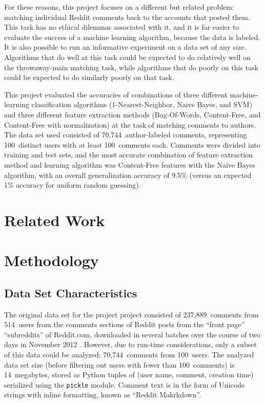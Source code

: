 \documentclass{article}
\begin{document}
For these reasons, this project focuses on a different but related problem: matching individual Reddit comments back to the accounts that posted them. This task has no ethical dilemmas associated with it, and it is far easier to evaluate the success of a machine learning algorithm, because the data is labeled. It is also possible to run an informative experiment on a data set of any size. Algorithms that do well at this task could be expected to do relatively well on the throwaway-main matching task, while algorithms that do poorly on this task could be expected to do similarly poorly on that task.

This project evaluated the accuracies of combinations of three different machine-learning classification algorithms (1-Nearest-Neighbor, Naive Bayes, and SVM) and three different feature extraction methods (Bag-Of-Words, Content-Free, and Content-Free with normalization) at the task of matching comments to authors. The data set used consisted of 70,744~author-labeled comments, representing 100~distinct users with at least 100~comments each. Comments were divided into training and test sets, and the most accurate combination of feature extraction method and learning algorithm was Content-Free features with the Naive Bayes algorithm, with an overall generalization accuracy of 9.5\% (versus an expected 1\% accuracy for uniform random guessing). 

\section{Related Work}


\section{Methodology}

\subsection{Data Set Characteristics}
The original data set for the project project consisted of 237,889~comments from 514~users from the comments sections of Reddit posts from the ``front page'' ``subreddits'' of Reddit.com, downloaded in several batches over the course of two days in November 2012 \cite{reddit2012reddit}. However, due to run-time considerations, only a subset of this data could be analyzed: 70,744~comments from 100~users. The analyzed data set size (before filtering out users with fewer than 100~comments) is 14~megabytes, stored as Python tuples of (user name, comment, creation time) serialized using the \texttt{pickle} module. Comment text is in the form of Unicode strings with inline formatting, known as ``Reddit Makrkdown''. 
\end{document}
